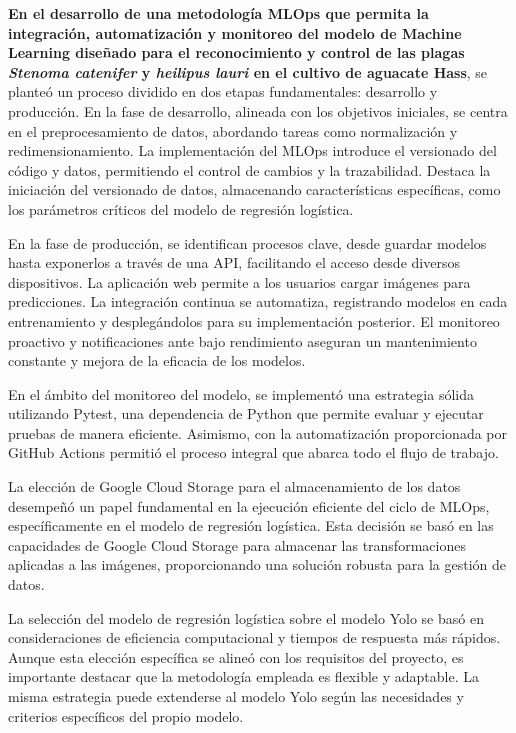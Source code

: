 \textbf{En el desarrollo de una metodología MLOps que permita la integración, automatización y monitoreo del modelo de Machine Learning diseñado para el reconocimiento y control de las plagas \textit{Stenoma catenifer} y \textit{heilipus lauri} en el cultivo de aguacate Hass}, se planteó un proceso dividido en dos etapas fundamentales: desarrollo y producción. En la fase de desarrollo, alineada con los objetivos iniciales, se centra en el preprocesamiento de datos, abordando tareas como normalización y redimensionamiento. La implementación del MLOps introduce el versionado del código y datos, permitiendo el control de cambios y la trazabilidad. Destaca la iniciación del versionado de datos, almacenando características específicas, como los parámetros críticos del modelo de regresión logística. 

En la fase de producción, se identifican procesos clave, desde guardar modelos hasta exponerlos a través de una API, facilitando el acceso desde diversos dispositivos. La aplicación web permite a los usuarios cargar imágenes para predicciones. La integración continua se automatiza, registrando modelos en cada entrenamiento y desplegándolos para su implementación posterior. El monitoreo proactivo y notificaciones ante bajo rendimiento aseguran un mantenimiento constante y mejora de la eficacia de los modelos.

En el ámbito del monitoreo del modelo, se implementó una estrategia sólida utilizando Pytest, una dependencia de Python que permite evaluar y ejecutar pruebas de manera eficiente. Asimismo, con la automatización proporcionada por GitHub Actions permitió el proceso integral que abarca todo el flujo de trabajo.

\newpage

La elección de Google Cloud Storage para el almacenamiento de los datos desempeñó un papel fundamental en la ejecución eficiente del ciclo de MLOps, específicamente en el modelo de regresión logística. Esta decisión se basó en las capacidades de Google Cloud Storage para almacenar las transformaciones aplicadas a las imágenes, proporcionando una solución robusta para la gestión de datos.

La selección del modelo de regresión logística sobre el modelo Yolo se basó en consideraciones de eficiencia computacional y tiempos de respuesta más rápidos. Aunque esta elección específica se alineó con los requisitos del proyecto, es importante destacar que la metodología empleada es flexible y adaptable. La misma estrategia puede extenderse al modelo Yolo según las necesidades y criterios específicos del propio modelo.

